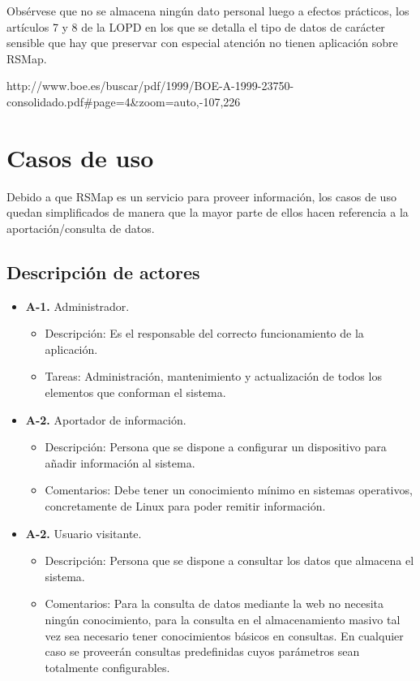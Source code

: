 Obsérvese que no se almacena ningún dato personal luego a efectos prácticos, los artículos 7 y 8 de la LOPD en los que se detalla el tipo de datos de carácter sensible que hay que preservar con especial atención no tienen aplicación sobre RSMap.

http://www.boe.es/buscar/pdf/1999/BOE-A-1999-23750-consolidado.pdf#page=4&zoom=auto,-107,226

\newpage

\section{Casos de uso}

Debido a que RSMap es un servicio para proveer información, los casos de uso quedan simplificados de manera que la mayor parte de ellos hacen referencia a la aportación/consulta de datos.

\subsection{Descripción de actores}

\begin{itemize}
  \item \textbf{A-1.} Administrador.
  \begin{itemize}
   \item Descripción: Es el responsable del correcto funcionamiento de la aplicación.
   \item Tareas: Administración, mantenimiento y actualización de todos los elementos que conforman el sistema.
  \end{itemize}

  \item \textbf{A-2.} Aportador de información.
  \begin{itemize}
   \item Descripción: Persona que se dispone a configurar un dispositivo para añadir información al sistema.
   \item Comentarios: Debe tener un conocimiento mínimo en sistemas operativos, concretamente de Linux para poder remitir información.
  \end{itemize}

  \item \textbf{A-2.} Usuario visitante.
  \begin{itemize}
   \item Descripción: Persona que se dispone a consultar los datos que almacena el sistema.
   \item Comentarios: Para la consulta de datos mediante la web no necesita ningún conocimiento, para la consulta en el almacenamiento masivo tal vez sea necesario tener conocimientos básicos en consultas. En cualquier caso se proveerán consultas predefinidas cuyos parámetros sean totalmente configurables.
  \end{itemize}
\end{itemize}

